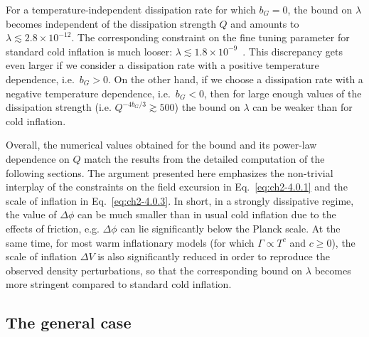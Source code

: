 For a temperature-independent dissipation rate for which $b_G=0$, the bound on $\lambda$ becomes independent of the dissipation strength $Q$ and amounts to $\lambda\lesssim 2.8\times 10^{-12}$. The corresponding constraint on the fine tuning parameter for standard cold inflation is much looser: $\lambda\lesssim 1.8\times 10^{-9}$~\citep{Adams:1990pn}. This discrepancy gets even larger if we consider a dissipation rate with a positive temperature dependence, i.e.\ $b_G>0$.
On the other hand, if we choose a dissipation rate with a negative temperature dependence, i.e.\ $b_G<0$, then for large enough values of the dissipation strength (i.e. $Q^{-4 b_G/3}\gtrsim 500$) the bound on $\lambda$ can be weaker than for cold inflation.

Overall, the numerical values obtained for the bound and its power-law dependence on $Q$ match the results from the detailed computation of the following sections. The argument presented here emphasizes the non-trivial interplay of the constraints on the field excursion in Eq.~\ref{eq:ch2-4.0.1} and the scale of inflation in Eq.~\ref{eq:ch2-4.0.3}. In short, in a strongly dissipative regime, the value of $\Delta\phi$ can be much smaller than in usual cold inflation due to the effects of friction, e.g. $\Delta\phi$ can lie significantly below the Planck scale. At the same time, for most warm inflationary models (for which $\Gamma\propto T^c$ and $c\geq 0$), the scale of inflation $\Delta V$ is also significantly reduced in order to reproduce the observed density perturbations, so that the corresponding bound on $\lambda$ becomes more stringent compared to standard cold inflation.

\subsection{The general case \label{sec:ch2-4.1}}

